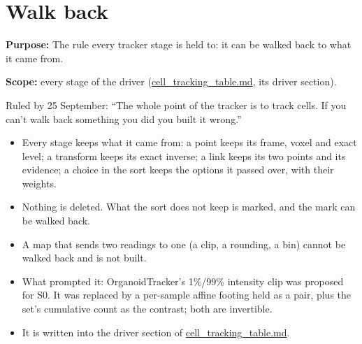 \chapter{\texorpdfstring{Walk back}{Walk back}}
\label{chap:walk-back}

\textbf{Purpose:} The rule every tracker stage is held to: it can be walked back to what it came from.

\textbf{Scope:} every stage of the driver (\hyperref[chap:cell-tracking-table]{cell\_\allowbreak{}tracking\_\allowbreak{}table.md}, its driver section).

Ruled by 25 September: “The whole point of the tracker is to track cells. If you can't walk back something you did you built it wrong.”

\begin{itemize}
\item Every stage keeps what it came from: a point keeps its frame, voxel and exact level; a transform keeps its exact inverse; a link keeps its two points and its evidence; a choice in the sort keeps the options it passed over, with their weights.
\item Nothing is deleted. What the sort does not keep is marked, and the mark can be walked back.
\item A map that sends two readings to one (a clip, a rounding, a bin) cannot be walked back and is not built.
\item What prompted it: OrganoidTracker's 1\%/99\% intensity clip was proposed for S0. It was replaced by a per-sample affine footing held as a pair, plus the set's cumulative count as the contrast; both are invertible.
\item It is written into the driver section of \hyperref[chap:cell-tracking-table]{cell\_\allowbreak{}tracking\_\allowbreak{}table.md}.
\end{itemize}

